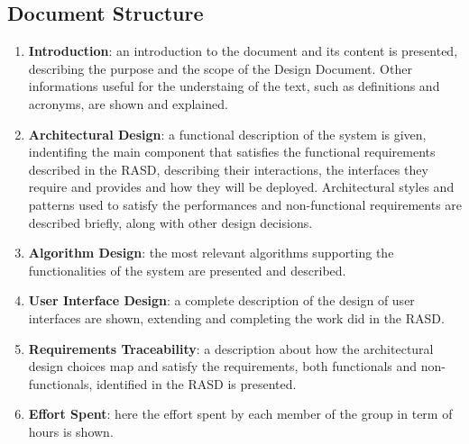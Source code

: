 \subsection{Document Structure}

\begin{enumerate}
	\item \textbf{Introduction}: an introduction to the document and its content is presented, describing the purpose and the scope of the Design Document. Other informations useful for the understaing of the text, such as definitions and acronyms, are shown and explained.
	\item \textbf{Architectural Design}: a functional description of the system is given, indentifing the main component that satisfies the functional requirements described in the RASD, describing their interactions, the interfaces they require and provides and how they will be deployed.
Architectural styles and patterns used to satisfy the performances and non-functional requirements are described briefly, along with other design decisions.
	\item \textbf{Algorithm Design}: the most relevant algorithms supporting the functionalities of the system are presented and described.
	\item \textbf{User Interface Design}: a complete description of the design of user interfaces are shown, extending and completing the work did in the RASD.
	\item \textbf{Requirements Traceability}: a description about how the architectural design choices map and satisfy the requirements, both functionals and non-functionals, identified in the RASD is presented.
	\item \textbf{Effort Spent}: here the effort spent by each member of the group in term of hours is shown.
\end{enumerate}
